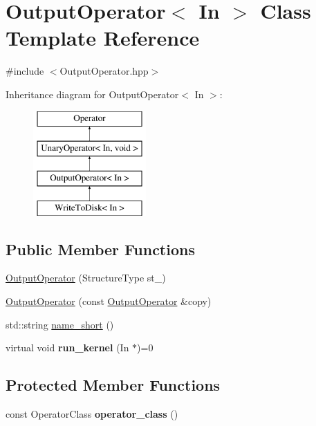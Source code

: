 \hypertarget{class_output_operator}{\section{\-Output\-Operator$<$ \-In $>$ \-Class \-Template \-Reference}
\label{class_output_operator}
}


{\ttfamily \#include $<$\-Output\-Operator.\-hpp$>$}

\-Inheritance diagram for \-Output\-Operator$<$ \-In $>$\-:\begin{figure}[H]
\begin{center}
\leavevmode
\includegraphics[height=4.000000cm]{class_output_operator}
\end{center}
\end{figure}
\subsection*{\-Public \-Member \-Functions}
\begin{DoxyCompactItemize}
\item 
\hyperlink{class_output_operator_a11cc69b762cccf13c16de81705cb1808}{\-Output\-Operator} (\-Structure\-Type st\-\_\-)
\item 
\hyperlink{class_output_operator_a62379779fb1e0eb3446cb406a8e8d035}{\-Output\-Operator} (const \hyperlink{class_output_operator}{\-Output\-Operator} \&copy)
\item 
std\-::string \hyperlink{class_output_operator_aa0d416361680f33ebd6e1785a97bc3fe}{name\-\_\-short} ()
\item 
\hypertarget{class_output_operator_a71c66a7b3b093947272de215d8706e1f}{virtual void {\bfseries run\-\_\-kernel} (\-In $\ast$)=0}\label{class_output_operator_a71c66a7b3b093947272de215d8706e1f}

\end{DoxyCompactItemize}
\subsection*{\-Protected \-Member \-Functions}
\begin{DoxyCompactItemize}
\item 
\hypertarget{class_output_operator_a76c77bafddc3651ae9afc5ff2a46ba15}{const \-Operator\-Class {\bfseries operator\-\_\-class} ()}\label{class_output_operator_a76c77bafddc3651ae9afc5ff2a46ba15}

\end{DoxyCompactItemize}


